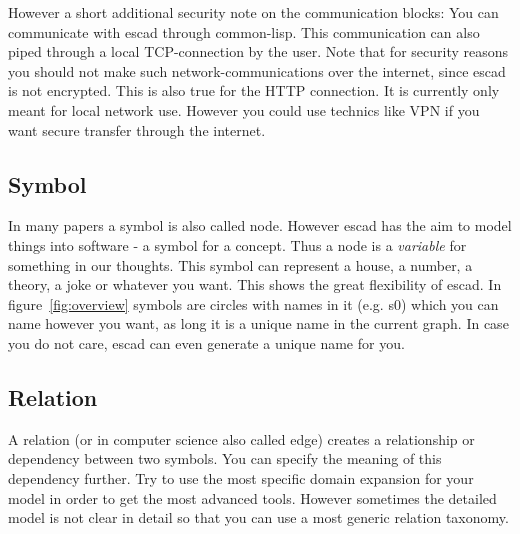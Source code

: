 \documentclass[a4paper, 12pt, openany]{scrbook}
\begin{document}
However a short additional security note on the communication blocks: You can communicate with escad through common-lisp. This communication can also piped through a local TCP-connection by the user. Note that for security reasons you should not make such network-communications over the internet, since escad is not encrypted. This is also true for the HTTP connection. It is currently only meant for local network use. However you could use technics like VPN if you want secure transfer through the internet.
\subsection{Symbol}
In many papers a symbol is also called node. However escad has the aim to model things into software - a symbol for a concept. Thus a node is a \emph{variable} for something in our thoughts. This symbol can represent a house, a number, a theory, a joke or whatever you want. This shows the great flexibility of escad. In figure~\ref{fig:overview} symbols are circles with names in it (e.g. s0) which you can name however you want, as long it is a unique name in the current graph. In case you do not care, escad can even generate a unique name for you.
\subsection{Relation}
A relation (or in computer science also called edge) creates a relationship or dependency between two symbols. You can specify the meaning of this dependency further. Try to use the most specific domain expansion for your model in order to get the most advanced tools. However sometimes the detailed model is not clear in detail so that you can use a most generic relation taxonomy.
\end{document}
